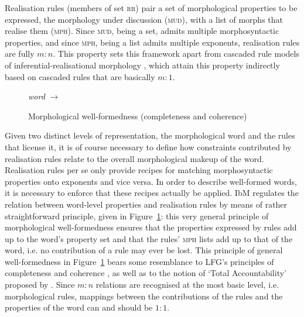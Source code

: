 Realisation rules (members of set \textsc{rr}) pair a set of
morphological properties to be expressed, the morphology under
discussion (\textsc{mud}), with a list of morphs that realise them
(\textsc{mph}). Since \textsc{mud}, being a set, admits multiple
morphosyntactic properties, and since \textsc{mph}, being a list
admits multiple exponents, realisation rules are fully $m:n$. This
property sets this framework apart from cascaded rule models of
inferential-realisational morphology \citep{Anderson92,Stump01}, which
attain this property indirectly based on cascaded rules that are
basically $m:1$.

\begin{figure}[htb]
  \begin{center}

    \textit{word} $\rightarrow$
    \begin{avm}
    \end{avm}
      \end{center}
  \caption{Morphological well-formedness (completeness and coherence)}
  \label{fig:MCC}
\end{figure}

Given two distinct levels of representation, the morphological word
and the rules that license it, it is of course necessary
to define how constraints contributed by realisation rules relate to
the overall morphological makeup of the word. Realisation rules per se
only provide recipes for matching morphosyntactic properties onto
exponents and vice versa. In order to describe well-formed words, it
is necessary to enforce that these recipes actually be applied. IbM
regulates the relation between word-level properties and realisation
rules by means of  rather straightforward principle, given in
Figure~\ref{fig:MCC}: this very general principle of morphological well-formedness  ensures that the properties expressed by rules add up
to the word's property set and that the rules' \textsc{mph} lists add
up to that of the word, i.e. no contribution of a rule may ever be
lost. This principle of general well-formedness in
Figure~\ref{fig:MCC} bears some resemblance to LFG's principles of
completeness and coherence \citep{bresnan_j82}, as well as to the
notion of `Total Accountability' proposed by \citet{Hockett47}. Since
$m:n$ relations are recognised at the most basic level,
i.e. morphological rules, mappings between the contributions of the
rules and the properties of the word can and should be $1:1$.

